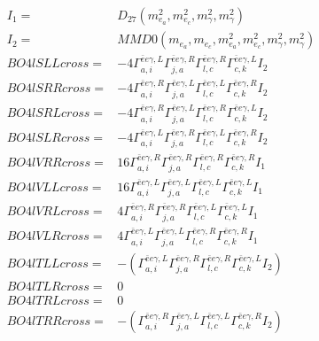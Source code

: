 \documentclass[A4,landscape]{article}
\begin{document}
\begin{align} 
I_1 = & D_{27}(m^2_{e_{{a}}}, m^2_{e_{{c}}}, m^2_{\gamma}, m^2_{\gamma}) \\ 
I_2 = & MMD0(m_{e_{{a}}}, m_{e_{{c}}}, m^2_{e_{{a}}}, m^2_{e_{{c}}}, m^2_{\gamma}, m^2_{\gamma}) \\ 
  BO4lSLLcross= & -4  \Gamma^{\bar{e}e \gamma ,L}_{a, i} \Gamma^{\bar{e}e \gamma ,R}_{j, a} \Gamma^{\bar{e}e \gamma ,R}_{l, c} \Gamma^{\bar{e}e \gamma ,L}_{c, k} I_2 \\ 
  BO4lSRRcross= & -4  \Gamma^{\bar{e}e \gamma ,R}_{a, i} \Gamma^{\bar{e}e \gamma ,L}_{j, a} \Gamma^{\bar{e}e \gamma ,L}_{l, c} \Gamma^{\bar{e}e \gamma ,R}_{c, k} I_2 \\ 
  BO4lSRLcross= & -4  \Gamma^{\bar{e}e \gamma ,R}_{a, i} \Gamma^{\bar{e}e \gamma ,L}_{j, a} \Gamma^{\bar{e}e \gamma ,R}_{l, c} \Gamma^{\bar{e}e \gamma ,L}_{c, k} I_2 \\ 
  BO4lSLRcross= & -4  \Gamma^{\bar{e}e \gamma ,L}_{a, i} \Gamma^{\bar{e}e \gamma ,R}_{j, a} \Gamma^{\bar{e}e \gamma ,L}_{l, c} \Gamma^{\bar{e}e \gamma ,R}_{c, k} I_2 \\ 
  BO4lVRRcross= & 16  \Gamma^{\bar{e}e \gamma ,R}_{a, i} \Gamma^{\bar{e}e \gamma ,R}_{j, a} \Gamma^{\bar{e}e \gamma ,R}_{l, c} \Gamma^{\bar{e}e \gamma ,R}_{c, k} I_1 \\ 
  BO4lVLLcross= & 16  \Gamma^{\bar{e}e \gamma ,L}_{a, i} \Gamma^{\bar{e}e \gamma ,L}_{j, a} \Gamma^{\bar{e}e \gamma ,L}_{l, c} \Gamma^{\bar{e}e \gamma ,L}_{c, k} I_1 \\ 
  BO4lVRLcross= & 4  \Gamma^{\bar{e}e \gamma ,R}_{a, i} \Gamma^{\bar{e}e \gamma ,R}_{j, a} \Gamma^{\bar{e}e \gamma ,L}_{l, c} \Gamma^{\bar{e}e \gamma ,L}_{c, k} I_1 \\ 
  BO4lVLRcross= & 4  \Gamma^{\bar{e}e \gamma ,L}_{a, i} \Gamma^{\bar{e}e \gamma ,L}_{j, a} \Gamma^{\bar{e}e \gamma ,R}_{l, c} \Gamma^{\bar{e}e \gamma ,R}_{c, k} I_1 \\ 
  BO4lTLLcross= & -( \Gamma^{\bar{e}e \gamma ,L}_{a, i} \Gamma^{\bar{e}e \gamma ,R}_{j, a} \Gamma^{\bar{e}e \gamma ,R}_{l, c} \Gamma^{\bar{e}e \gamma ,L}_{c, k} I_2) \\ 
  BO4lTLRcross= & 0 \\ 
  BO4lTRLcross= & 0 \\ 
  BO4lTRRcross= & -( \Gamma^{\bar{e}e \gamma ,R}_{a, i} \Gamma^{\bar{e}e \gamma ,L}_{j, a} \Gamma^{\bar{e}e \gamma ,L}_{l, c} \Gamma^{\bar{e}e \gamma ,R}_{c, k} I_2) \\ 
\end{align} 
\end{document}
